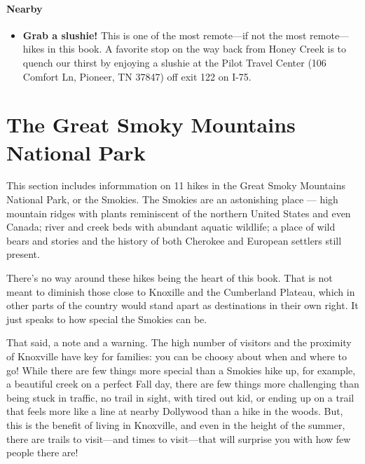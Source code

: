 \documentclass[
  letterpaper,
  DIV=11,
  numbers=noendperiod]{scrreprt}
\providecommand{\tightlist}{%
  \setlength{\itemsep}{0pt}\setlength{\parskip}{0pt}}\usepackage{longtable,booktabs,array}
\begin{document}
\subsection{Nearby}\label{nearby-18}

\begin{itemize}
\tightlist
\item
  \textbf{Grab a slushie!} This is one of the most remote---if not the
  most remote---hikes in this book. A favorite stop on the way back from
  Honey Creek is to quench our thirst by enjoying a slushie at the Pilot
  Travel Center (106 Comfort Ln, Pioneer, TN 37847) off exit 122 on
  I-75.
\end{itemize}

\part{The Great Smoky Mountains National Park}

This section includes informmation on 11 hikes in the Great Smoky
Mountains National Park, or the Smokies. The Smokies are an astonishing
place --- high mountain ridges with plants reminiscent of the northern
United States and even Canada; river and creek beds with abundant
aquatic wildlife; a place of wild bears and stories and the history of
both Cherokee and European settlers still present.

There's no way around these hikes being the heart of this book. That is
not meant to diminish those close to Knoxille and the Cumberland
Plateau, which in other parts of the country would stand apart as
destinations in their own right. It just speaks to how special the
Smokies can be.

That said, a note and a warning. The high number of visitors and the
proximity of Knoxville have key for families: you can be choosy about
when and where to go! While there are few things more special than a
Smokies hike up, for example, a beautiful creek on a perfect Fall day,
there are few things more challenging than being stuck in traffic, no
trail in sight, with tired out kid, or ending up on a trail that feels
more like a line at nearby Dollywood than a hike in the woods. But, this
is the benefit of living in Knoxville, and even in the height of the
summer, there are trails to visit---and times to visit---that will
surprise you with how few people there are!
\end{document}
